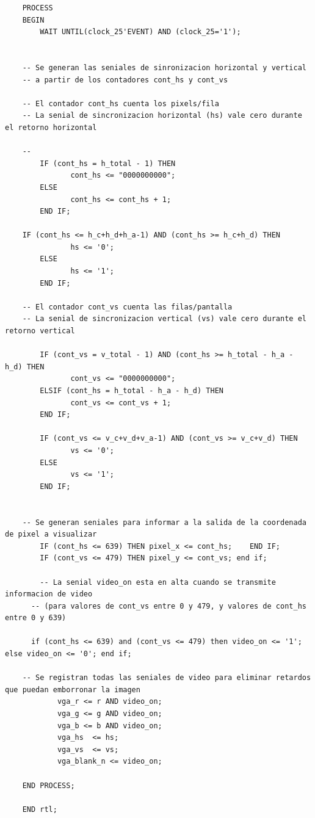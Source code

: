 \begin{lstlisting}
    PROCESS
    BEGIN
        WAIT UNTIL(clock_25'EVENT) AND (clock_25='1');
    
    
    -- Se generan las seniales de sinronizacion horizontal y vertical
    -- a partir de los contadores cont_hs y cont_vs
    
    -- El contador cont_hs cuenta los pixels/fila
    -- La senial de sincronizacion horizontal (hs) vale cero durante el retorno horizontal 
    
    --
        IF (cont_hs = h_total - 1) THEN
               cont_hs <= "0000000000";
        ELSE
               cont_hs <= cont_hs + 1;
        END IF;
    
    IF (cont_hs <= h_c+h_d+h_a-1) AND (cont_hs >= h_c+h_d) THEN
               hs <= '0';
        ELSE
               hs <= '1';
        END IF;
    
    -- El contador cont_vs cuenta las filas/pantalla
    -- La senial de sincronizacion vertical (vs) vale cero durante el retorno vertical
    
        IF (cont_vs = v_total - 1) AND (cont_hs >= h_total - h_a - h_d) THEN
               cont_vs <= "0000000000";
        ELSIF (cont_hs = h_total - h_a - h_d) THEN
               cont_vs <= cont_vs + 1;
        END IF;
    
        IF (cont_vs <= v_c+v_d+v_a-1) AND (cont_vs >= v_c+v_d) THEN
               vs <= '0';
        ELSE
               vs <= '1';
        END IF;
    
    
    -- Se generan seniales para informar a la salida de la coordenada de pixel a visualizar
        IF (cont_hs <= 639) THEN pixel_x <= cont_hs;	END IF;
        IF (cont_vs <= 479) THEN pixel_y <= cont_vs; end if; 
        
        -- La senial video_on esta en alta cuando se transmite informacion de video
      -- (para valores de cont_vs entre 0 y 479, y valores de cont_hs entre 0 y 639)
     
      if (cont_hs <= 639) and (cont_vs <= 479) then video_on <= '1'; else video_on <= '0'; end if;
    
    -- Se registran todas las seniales de video para eliminar retardos que puedan emborronar la imagen
            vga_r <= r AND video_on;
            vga_g <= g AND video_on;
            vga_b <= b AND video_on;
            vga_hs 	<= hs;
            vga_vs 	<= vs;
            vga_blank_n <= video_on;
    
    END PROCESS;
    
    END rtl;
\end{lstlisting}

